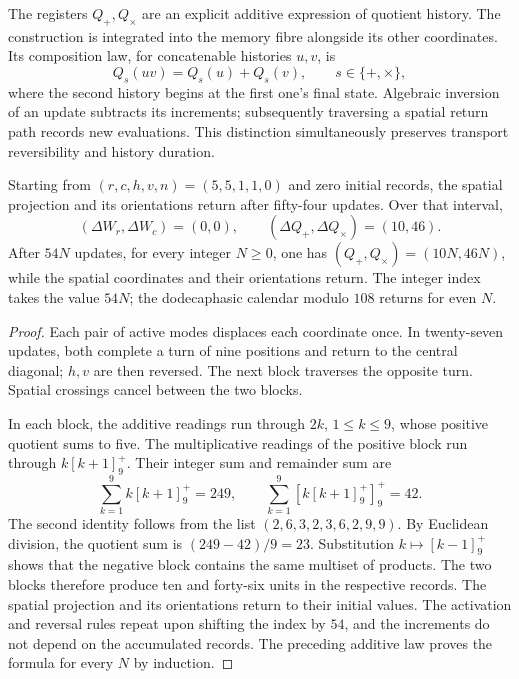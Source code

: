The registers \(Q_+,Q_\times\) are an explicit additive expression of quotient history. The construction is integrated into the memory fibre alongside its other coordinates. Its composition law, for concatenable histories \(u,v\), is
\[
 Q_s(uv)=Q_s(u)+Q_s(v),\qquad s\in\{+,\times\},
\]
where the second history begins at the first one's final state.
Algebraic inversion of an update subtracts its increments;
subsequently traversing a spatial return path records
new evaluations. This distinction simultaneously preserves
transport reversibility and history duration.

\begin{proposition}
\label{ii:ii:electron-memoria-retorno}
Starting from \((r,c,h,v,n)=(5,5,1,1,0)\) and zero initial records, the
spatial projection and its orientations return after fifty-four
updates. Over that interval,
\[
 (\Delta W_r,\Delta W_c)=(0,0),\qquad
 (\Delta Q_+,\Delta Q_\times)=(10,46).
\]
After \(54N\) updates, for every integer \(N\geq0\),
one has \((Q_+,Q_\times)=(10N,46N)\), while the spatial
coordinates and their orientations return. The integer index takes the value
\(54N\); the dodecaphasic calendar modulo \(108\) returns for
even \(N\).
\end{proposition}
\begin{proof}
Each pair of active modes displaces each coordinate once. In
twenty-seven updates, both complete a turn of nine
positions and return to the central diagonal; \(h,v\) are then
reversed. The next block traverses the opposite turn. Spatial
crossings cancel between the two blocks.

In each block, the additive readings run through \(2k\),
\(1\leq k\leq9\), whose positive quotient sums to five. The
multiplicative readings of the positive block run through
\(k[k+1]^+_9\). Their integer sum and remainder sum are
\[
 \sum_{k=1}^9 k[k+1]^+_9=249,\qquad
 \sum_{k=1}^9[k[k+1]^+_9]^+_9=42.
\]
The second identity follows from the list
\((2,6,3,2,3,6,2,9,9)\). By Euclidean division,
the quotient sum is \((249-42)/9=23\). Substitution
\(k\mapsto[k-1]^+_9\) shows that the negative block contains
the same multiset of products. The two blocks therefore produce
ten and forty-six units in the respective records.
The spatial projection and its orientations return to their initial
values. The activation and reversal rules repeat upon
shifting the index by \(54\), and the increments do not depend on
the accumulated records. The preceding additive law
proves the formula for every \(N\) by induction.
\end{proof}

